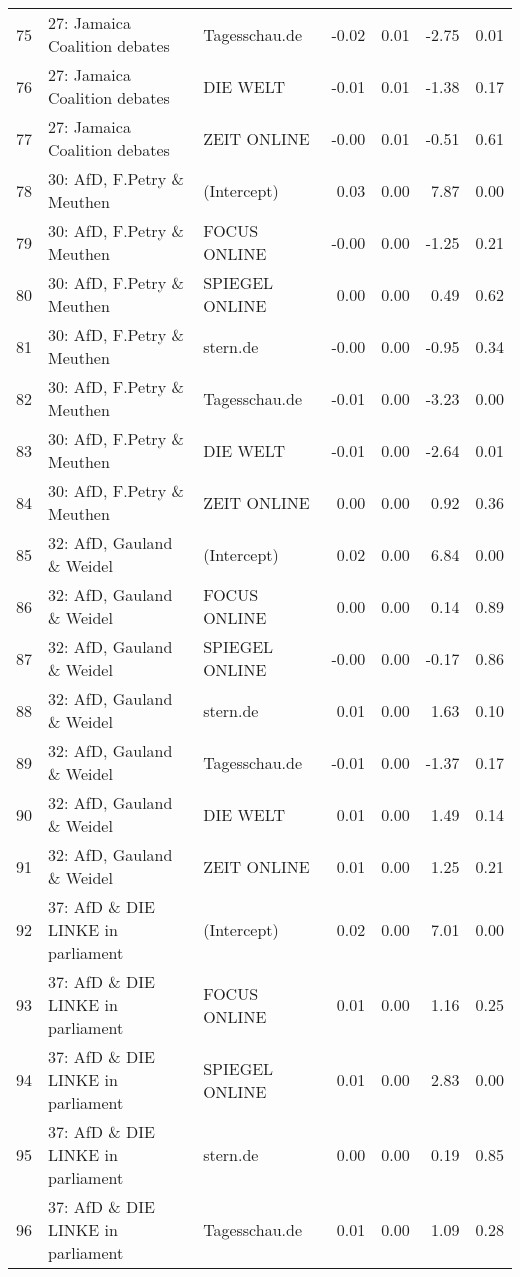 \begin{table}[ht]
{\begin{tabular}{rllrrrr}
  75 & 27: Jamaica Coalition debates & Tagesschau.de & -0.02 & 0.01 & -2.75 & 0.01 \\ 
  76 & 27: Jamaica Coalition debates & DIE WELT & -0.01 & 0.01 & -1.38 & 0.17 \\ 
  77 & 27: Jamaica Coalition debates & ZEIT ONLINE & -0.00 & 0.01 & -0.51 & 0.61 \\ 
  78 & 30: AfD, F.Petry \& Meuthen & (Intercept) & 0.03 & 0.00 & 7.87 & 0.00 \\ 
  79 & 30: AfD, F.Petry \& Meuthen & FOCUS ONLINE & -0.00 & 0.00 & -1.25 & 0.21 \\ 
  80 & 30: AfD, F.Petry \& Meuthen & SPIEGEL ONLINE & 0.00 & 0.00 & 0.49 & 0.62 \\ 
  81 & 30: AfD, F.Petry \& Meuthen & stern.de & -0.00 & 0.00 & -0.95 & 0.34 \\ 
  82 & 30: AfD, F.Petry \& Meuthen & Tagesschau.de & -0.01 & 0.00 & -3.23 & 0.00 \\ 
  83 & 30: AfD, F.Petry \& Meuthen & DIE WELT & -0.01 & 0.00 & -2.64 & 0.01 \\ 
  84 & 30: AfD, F.Petry \& Meuthen & ZEIT ONLINE & 0.00 & 0.00 & 0.92 & 0.36 \\ 
  85 & 32: AfD, Gauland \& Weidel & (Intercept) & 0.02 & 0.00 & 6.84 & 0.00 \\ 
  86 & 32: AfD, Gauland \& Weidel & FOCUS ONLINE & 0.00 & 0.00 & 0.14 & 0.89 \\ 
  87 & 32: AfD, Gauland \& Weidel & SPIEGEL ONLINE & -0.00 & 0.00 & -0.17 & 0.86 \\ 
  88 & 32: AfD, Gauland \& Weidel & stern.de & 0.01 & 0.00 & 1.63 & 0.10 \\ 
  89 & 32: AfD, Gauland \& Weidel & Tagesschau.de & -0.01 & 0.00 & -1.37 & 0.17 \\ 
  90 & 32: AfD, Gauland \& Weidel & DIE WELT & 0.01 & 0.00 & 1.49 & 0.14 \\ 
  91 & 32: AfD, Gauland \& Weidel & ZEIT ONLINE & 0.01 & 0.00 & 1.25 & 0.21 \\ 
  92 & 37: AfD \& DIE LINKE in parliament & (Intercept) & 0.02 & 0.00 & 7.01 & 0.00 \\ 
  93 & 37: AfD \& DIE LINKE in parliament & FOCUS ONLINE & 0.01 & 0.00 & 1.16 & 0.25 \\ 
  94 & 37: AfD \& DIE LINKE in parliament & SPIEGEL ONLINE & 0.01 & 0.00 & 2.83 & 0.00 \\ 
  95 & 37: AfD \& DIE LINKE in parliament & stern.de & 0.00 & 0.00 & 0.19 & 0.85 \\ 
  96 & 37: AfD \& DIE LINKE in parliament & Tagesschau.de & 0.01 & 0.00 & 1.09 & 0.28 \\ 

\end{tabular}}
\end{table}

